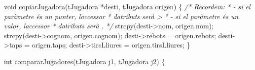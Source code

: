 \documentclass[
]{book}
\newenvironment{Shaded}{\begin{snugshade}}{\end{snugshade}}
\newcommand{\CommentTok}[1]{\textcolor[rgb]{0.56,0.35,0.01}{\textit{#1}}}
\newcommand{\DataTypeTok}[1]{\textcolor[rgb]{0.13,0.29,0.53}{#1}}
\newcommand{\NormalTok}[1]{#1}
\begin{document}
\begin{Shaded}
\begin{Highlighting}[]
\DataTypeTok{void}\NormalTok{ copiarJugadora(tJugadora *desti, tJugadora origen) \{}
    \CommentTok{/* Recordem: }
\CommentTok{     * {-} si el paràmetre és un punter, l\textquotesingle{}accessor }
\CommentTok{     *   d\textquotesingle{}atributs serà \textquotesingle{}{-}\textgreater{}\textquotesingle{}}
\CommentTok{     * {-} si el paràmetre és un valor, l\textquotesingle{}accessor}
\CommentTok{     *   d\textquotesingle{}atributs serà \textquotesingle{}.\textquotesingle{}}
\CommentTok{     */}
\NormalTok{    strcpy(desti{-}\textgreater{}nom, origen.nom);}
\NormalTok{    strcpy(desti{-}\textgreater{}cognom, origen.cognom);}
\NormalTok{    desti{-}\textgreater{}rebots = origen.rebots;}
\NormalTok{    desti{-}\textgreater{}taps = origen.taps;}
\NormalTok{    desti{-}\textgreater{}tirsLliures = origen.tirsLliures;}
\NormalTok{\}}

\DataTypeTok{int}\NormalTok{ compararJugadores(tJugadora j1, tJugadora j2) \{}
    

\end{Highlighting}
\end{Shaded}
\end{document}
